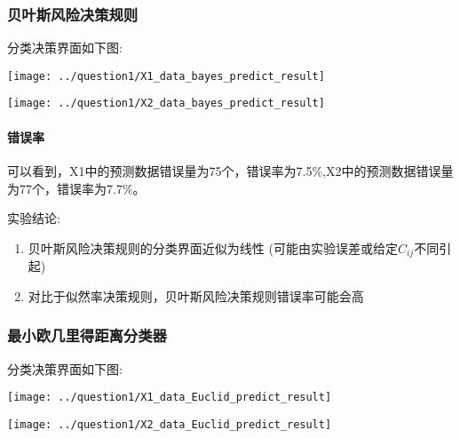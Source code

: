 \documentclass[UTF8]{article} %
\begin{document}
    \subsubsection{贝叶斯风险决策规则}

    分类决策界面如下图:

    \begin{minipage}[t]{0.5\linewidth}
        \centering
        \texttt{[image: ../question1/X1\_data\_bayes\_predict\_result]}
        \label{fig:bayes1} %
    \end{minipage}%
    \begin{minipage}[t]{0.5\linewidth}
        \centering
        \texttt{[image: ../question1/X2\_data\_bayes\_predict\_result]}
        \label{fig:bayes2} %
    \end{minipage}
    \paragraph{错误率}  可以看到，X1中的预测数据错误量为75个，错误率为7.5\%,X2中的预测数据错误量为77个，错误率为7.7\%。

    实验结论:
    \begin{enumerate}
        \item 贝叶斯风险决策规则的分类界面近似为线性 (可能由实验误差或给定$C_{ij}$不同引起)
        \item 对比于似然率决策规则，贝叶斯风险决策规则错误率可能会高
    \end{enumerate}

    \subsubsection{最小欧几里得距离分类器}

    分类决策界面如下图:

    \begin{minipage}[t]{0.5\linewidth}
        \centering
        \texttt{[image: ../question1/X1\_data\_Euclid\_predict\_result]}
        \label{fig:Euclid1} %
    \end{minipage}%
    \begin{minipage}[t]{0.5\linewidth}
        \centering
        \texttt{[image: ../question1/X2\_data\_Euclid\_predict\_result]}
        \label{fig:Euclid2} %
    \end{minipage}
\end{document}
